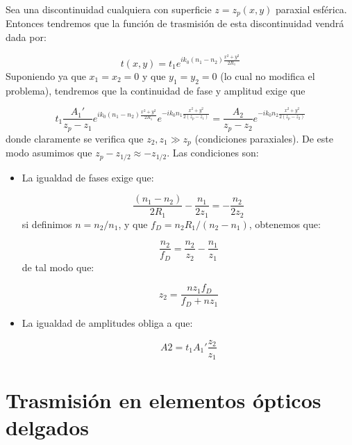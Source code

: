 \documentclass[12pt,a4paper]{book}
\numberwithin{equation}{section}
\numberwithin{figure}{section}
\newcommand{\1}{_{(1)}}
\newcommand{\2}{_{(2)}}
\theoremstyle{definition}
\begin{document}

\hrulefill

Sea una discontinuidad cualquiera con superficie $z=z_p(x,y)$ paraxial esférica. Entonces tendremos que la función de trasmisión de esta discontinuidad vendrá dada por:

\begin{equation}
t(x,y) = t_1 e^{i k_0(n_1-n_2) \frac{x^2+y^2}{2 R_1}}
\end{equation}
Suponiendo ya que $x_1=x_2 = 0$ y que $y_1=y_2=0$ (lo cual no modifica el problema), tendremos que la continuidad de fase y amplitud exige que

\begin{equation}
t_1 \frac{A_1'}{z_p - z_1} e^{i k_0(n_1-n_2) \frac{x^2+y^2}{2 R_1}} e^{-i k_0 n_1 \frac{x^2+y^2}{2(z_p - z_1)}} = \frac{A_2}{z_p - z_2} e^{-i k_0 n_2 \frac{x^2+y^2}{2(z_p - z_2)}}
\end{equation}
donde claramente se verifica que $z_2,z_1 \gg z_p$ (condiciones paraxiales). De este modo asumimos que $z_p-z_{1/2} \approx - z_{1/2}$. Las condiciones son:

\begin{itemize}
\item La igualdad de fases exige que: 

\begin{equation}
\frac{(n_1-n_2)}{2 R_1} - \frac{n_1}{ 2 z_1} = - \frac{n_2}{2 z_2}
\end{equation}
si definimos $n=n_2/n_1$, y que $f_D = n_2 R_1 /(n_2-n_1)$, obtenemos que:

\begin{equation}
\frac{n_2}{f_D} = \frac{n_2}{z_2} - \frac{n_1}{z_1}
\end{equation}
de tal modo que:

\begin{equation}
z_2=\frac{n z_1 f_D}{f_D+nz_1}
\end{equation}

\item La igualdad de amplitudes obliga a que:

\begin{equation}
A2 = t_1 A_1' \frac{z_2}{z_1}
\end{equation}

\end{itemize}

\hrulefill

\section{Trasmisión en elementos ópticos delgados}
\end{document}
